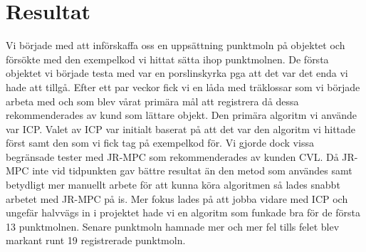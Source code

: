 \section{Resultat}
\label{sec:results-karlsson}


Vi började med att införskaffa oss en uppsättning punktmoln på objektet och försökte med den exempelkod vi hittat sätta ihop punktmolnen. De första objektet vi började testa med var en porslinskyrka pga att det var det enda vi hade att tillgå. Efter ett par veckor fick vi en låda med träklossar som vi började arbeta med och som blev vårat primära mål att registrera då dessa rekommenderades av kund som lättare objekt.
 Den primära algoritm vi använde var ICP. Valet av ICP var initialt baserat på att det var den algoritm vi hittade först samt den som vi fick tag på exempelkod för. Vi gjorde dock vissa begränsade tester med JR-MPC som rekommenderades av kunden CVL. Då JR-MPC inte vid tidpunkten gav bättre resultat än den metod som användes samt betydligt mer manuellt arbete för att kunna köra algoritmen så lades snabbt arbetet med JR-MPC på is. Mer fokus lades på att jobba vidare med ICP och ungefär halvvägs in i projektet hade vi en algoritm som funkade bra för de första 13 punktmolnen. Senare punktmoln hamnade mer och mer fel tills felet blev markant runt 19 registrerade punktmoln.

